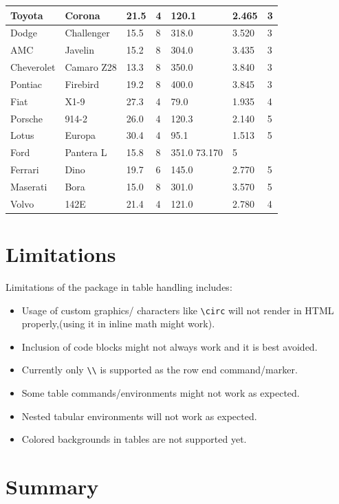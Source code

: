 \begin{longtable}{|p{2cm}|p{2.5cm}|p{1cm}|p{2cm}|p{2cm}|p{2cm}|p{1cm}|}
Toyota &Corona      & 21.5  & 4 &120.1 &2.465   & 3\\ \hline
Dodge &Challenger   & 15.5  & 8 &318.0 &3.520   & 3\\ \hline
AMC &Javelin        & 15.2  & 8 &304.0 &3.435   & 3\\ \hline
Cheverolet &Camaro Z28 & 13.3 & 8& 350.0 &3.840   & 3\\ \hline
Pontiac &Firebird   & 19.2  & 8 &400.0 &3.845   & 3\\ \hline
Fiat &X1-9          & 27.3  & 4 & 79.0 &1.935   & 4\\ \hline
Porsche& 914-2      & 26.0  & 4 &120.3 &2.140   & 5\\ \hline
Lotus& Europa       & 30.4  & 4 & 95.1 &1.513   & 5\\ \hline
Ford &Pantera L     & 15.8  & 8 &351.0 73.170   & 5\\ \hline
Ferrari &Dino       & 19.7  & 6 &145.0 &2.770   & 5\\ \hline
Maserati& Bora      & 15.0  & 8 &301.0 &3.570   & 5\\ \hline
Volvo &142E         & 21.4  & 4 &121.0 &2.780   & 4\\ 
\hline
\end{longtable}

\section{Limitations}

Limitations of the  package in table handling includes:
\begin{itemize}
\item Usage of custom graphics/ characters like \verb|\circ| will not render in HTML properly,(using it in inline math might work).
\item Inclusion of code blocks might not always work and it is best avoided.
\item Currently only \verb|\\| is supported as the row end command/marker.
\item Some table commands/environments might not work as expected.
\item Nested tabular environments will not work as expected.
\item Colored backgrounds in tables are not supported yet.
\end{itemize}



\section{Summary}


